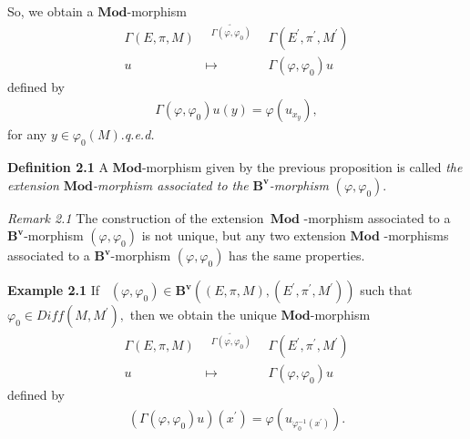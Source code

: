 \documentclass[11pt]{article}
\begin{document}
So, we obtain a $\mathbf{Mod}$-morphism%
\begin{equation*}
\begin{array}{ccc}
\Gamma \left( E,\pi ,M\right) & ^{\underrightarrow{~\ \ \Gamma \left(
\varphi ,\varphi _{0}\right) ~\ \ }} & \Gamma \left( E^{\prime },\pi
^{\prime },M^{\prime }\right) \\
u & \longmapsto & \Gamma \left( \varphi ,\varphi _{0}\right) u%
\end{array}%
\end{equation*}%
defined by
\begin{equation*}
\begin{array}{c}
\Gamma \left( \varphi ,\varphi _{0}\right) u\left( y\right) =\varphi \left(
u_{x_{y}}\right) ,%
\end{array}%
\end{equation*}%
for any $y\in \varphi _{0}\left( M\right) .$\hfill \emph{q.e.d.}\medskip

\textbf{Definition 2.1 }A $\mathbf{Mod}$-morphism given by the previous
proposition is called \emph{the extension }$\mathbf{Mod}$\emph{-morphism
associated to the }$\mathbf{B}^{\mathbf{v}}$\emph{-morphism }$\left( \varphi
,\varphi _{0}\right) .$

\textit{Remark 2.1 }The construction of the extension\emph{\ }$\mathbf{Mod}$%
-morphism associated to a $\mathbf{B}^{\mathbf{v}}$-morphism $\left( \varphi
,\varphi _{0}\right) $ is not unique, but any two extension $\mathbf{Mod}$%
-morphisms associated to a $\mathbf{B}^{\mathbf{v}}$-morphism $\left(
\varphi ,\varphi _{0}\right) $ has the same properties.

\textbf{Example 2.1 }If \ $\left( \varphi ,\varphi _{0}\right) \in \mathbf{B}%
^{\mathbf{v}}\left( \left( E,\pi ,M\right) ,\left( E^{\prime },\pi ^{\prime
},M^{\prime }\right) \right) $ such that $\varphi _{0}\in Diff\left(
M,M^{\prime }\right) ,$ then we obtain the unique $\mathbf{Mod}$-morphism%
\begin{equation*}
\begin{array}{ccc}
\Gamma \left( E,\pi ,M\right) & ^{\underrightarrow{~\ \ \Gamma \left(
\varphi ,\varphi _{0}\right) ~\ \ }} & \Gamma \left( E^{\prime },\pi
^{\prime },M^{\prime }\right) \\
u & \longmapsto & \Gamma \left( \varphi ,\varphi _{0}\right) u%
\end{array}%
\end{equation*}%
defined by
\begin{equation*}
\begin{array}{c}
\left( \Gamma \left( \varphi ,\varphi _{0}\right) u\right) \left( x^{\prime
}\right) =\varphi \left( u_{\varphi _{0}^{-1}\left( x^{\prime }\right)
}\right) .%
\end{array}%
\end{equation*}
\end{document}
